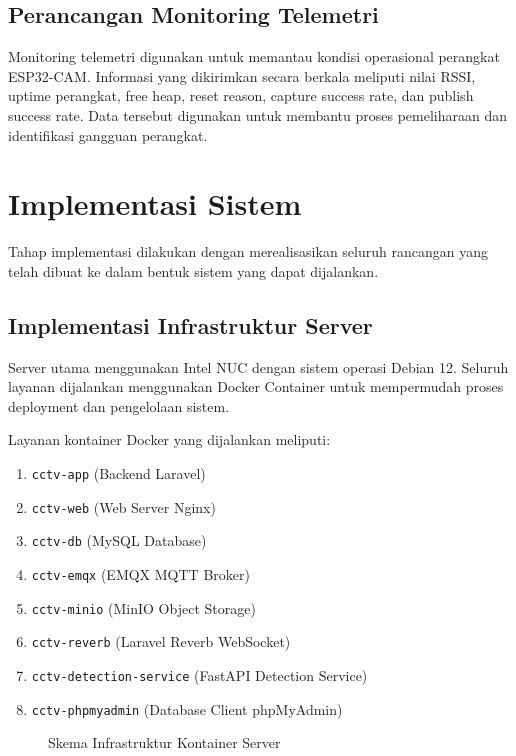 \subsection{Perancangan Monitoring Telemetri}

Monitoring telemetri digunakan untuk memantau kondisi operasional perangkat ESP32-CAM. Informasi yang dikirimkan secara berkala meliputi nilai RSSI, uptime perangkat, free heap, reset reason, capture success rate, dan publish success rate. Data tersebut digunakan untuk membantu proses pemeliharaan dan identifikasi gangguan perangkat.

\section{Implementasi Sistem}

Tahap implementasi dilakukan dengan merealisasikan seluruh rancangan yang telah dibuat ke dalam bentuk sistem yang dapat dijalankan.

\subsection{Implementasi Infrastruktur Server}

Server utama menggunakan Intel NUC dengan sistem operasi Debian 12. Seluruh layanan dijalankan menggunakan Docker Container untuk mempermudah proses deployment dan pengelolaan sistem.

Layanan kontainer Docker yang dijalankan meliputi:

\begin{enumerate}
	\item \texttt{cctv-app} (Backend Laravel)
	\item \texttt{cctv-web} (Web Server Nginx)
	\item \texttt{cctv-db} (MySQL Database)
	\item \texttt{cctv-emqx} (EMQX MQTT Broker)
	\item \texttt{cctv-minio} (MinIO Object Storage)
	\item \texttt{cctv-reverb} (Laravel Reverb WebSocket)
	\item \texttt{cctv-detection-service} (FastAPI Detection Service)
	\item \texttt{cctv-phpmyadmin} (Database Client phpMyAdmin)
\end{enumerate}

\begin{figure}[H]
\caption{Skema Infrastruktur Kontainer Server}
\label{fig:docker_deployment}
\end{figure}

